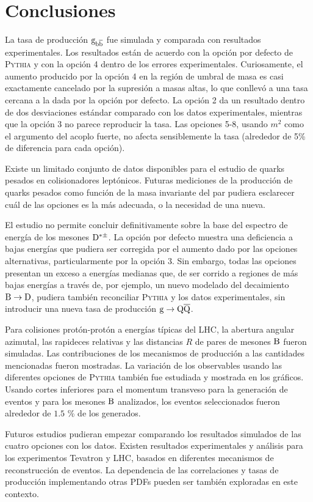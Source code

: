 \chapter{Conclusiones}
\label{sec:summary}

La tasa de producción ${\mathrm g}_{{\mathrm b}\overline{\mathrm b}}$ fue simulada y comparada con resultados experimentales. Los resultados están de acuerdo con la opción por defecto de \textsc{Pythia} y con la opción 4 dentro de los errores experimentales. Curiosamente, el aumento producido por la opción 4 en la región de umbral de masa es casi exactamente cancelado por la supresión a masas altas, lo que conllevó a una tasa cercana a la dada por la opción por defecto. La opción 2 da un resultado dentro de dos desviaciones estándar comparado con los datos experimentales, mientras que la opción 3 no parece reproducir la tasa. Las opciones 5-8, usando $m^2$ como el argumento  del acoplo fuerte, no afecta sensiblemente la tasa (alrededor de 5\% de diferencia para cada opción).

Existe un limitado conjunto de datos disponibles para el estudio de quarks pesados en colisionadores leptónicos. Futuras mediciones de la producción de quarks pesados como función de la masa invariante del par pudiera esclarecer cuál de las opciones es la más adecuada, o la necesidad de una nueva.

El estudio no permite concluir definitivamente sobre la base del espectro de energía de los mesones ${\mathrm D}^{*\pm}$. La opción por defecto muestra una deficiencia a bajas energías que pudiera ser corregida por el aumento dado por las opciones alternativas, particularmente por la opción 3. Sin embargo, todas las opciones presentan un exceso a energías medianas que, de ser corrido a regiones de más bajas energías a través de, por ejemplo, un nuevo modelado del decaimiento ${\mathrm B}\to{\mathrm D}$, pudiera también reconciliar \textsc{Pythia} y los datos experimentales, sin introducir una nueva tasa de producción ${\mathrm g}\to{\mathrm Q}\overline{\mathrm Q}$.

Para colisiones protón-protón a energías típicas del LHC, la abertura angular azimutal, las rapideces relativas y las distancias $R$ de pares de mesones ${\mathrm B}$ fueron simuladas. Las contribuciones de los mecanismos de producción a las cantidades mencionadas fueron mostradas. La variación de los observables usando las diferentes opciones de \textsc{Pythia} también fue estudiada y mostrada en los gráficos. Usando cortes inferiores para el momentum transveso para la generación de eventos y para los mesones ${\mathrm B}$ analizados, los eventos seleccionados fueron alrededor de $1.5$ \% de los generados.

Futuros estudios pudieran empezar comparando los resultados simulados de las cuatro opciones con los datos. Existen resultados experimentales y análisis para los experimentos Tevatron y LHC, basados en diferentes mecanismos de reconstrucción de eventos. La dependencia de las correlaciones y tasas de producción  implementando otras PDFs pueden ser también exploradas en este contexto.

